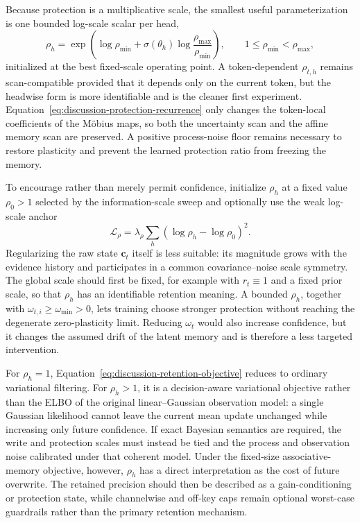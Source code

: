 \documentclass[11pt]{article}
\newcommand{\vct}[1]{\boldsymbol{#1}}
\begin{document}
Because protection is a multiplicative scale, the smallest useful parameterization is one bounded
log-scale scalar per head,
\begin{equation}
  \rho_h
  =\exp\!\left(
      \log\rho_{\min}
      +\sigma(\theta_h)\log\frac{\rho_{\max}}{\rho_{\min}}
    \right),
  \qquad
  1\leq\rho_{\min}<\rho_{\max},
  \label{eq:discussion-bounded-protection-ratio}
\end{equation}
initialized at the best fixed-scale operating point. A token-dependent $\rho_{t,h}$ remains
scan-compatible provided that it depends only on the current token, but the headwise form is more
identifiable and is the cleaner first experiment. Equation~\eqref{eq:discussion-protection-recurrence}
only changes the token-local coefficients of the M\"obius maps, so both the uncertainty scan and
the affine memory scan are preserved. A positive process-noise floor remains necessary to restore
plasticity and prevent the learned protection ratio from freezing the memory.

To encourage rather than merely permit confidence, initialize $\rho_h$ at a fixed value
$\rho_0>1$ selected by the information-scale sweep and optionally use the weak log-scale anchor
\begin{equation}
  \mathcal{L}_{\rho}
  =\lambda_{\rho}\sum_h
    \left(\log\rho_h-\log\rho_0\right)^2.
  \label{eq:discussion-protection-anchor}
\end{equation}
Regularizing the raw state $\vct{c}_t$ itself is less suitable: its magnitude grows with the
evidence history and participates in a common covariance--noise scale symmetry. The global scale
should first be fixed, for example with $r_t\equiv1$ and a fixed prior scale, so that $\rho_h$ has
an identifiable retention meaning. A bounded $\rho_h$, together with
$\omega_{t,i}\geq\omega_{\min}>0$, lets training choose stronger protection without reaching the
degenerate zero-plasticity limit. Reducing $\omega_t$ would also increase confidence, but it changes
the assumed drift of the latent memory and is therefore a less targeted intervention.

For $\rho_h=1$, Equation~\eqref{eq:discussion-retention-objective} reduces to ordinary variational
filtering. For $\rho_h>1$, it is a decision-aware variational objective rather than the ELBO of the
original linear--Gaussian observation model: a single Gaussian likelihood cannot leave the current
mean update unchanged while increasing only future confidence. If exact Bayesian semantics are
required, the write and protection scales must instead be tied and the process and observation
noise calibrated under that coherent model. Under the fixed-size associative-memory objective,
however, $\rho_h$ has a direct interpretation as the cost of future overwrite. The retained
precision should then be described as a gain-conditioning or protection state, while channelwise
and off-key caps remain optional worst-case guardrails rather than the primary retention mechanism.
\end{document}
